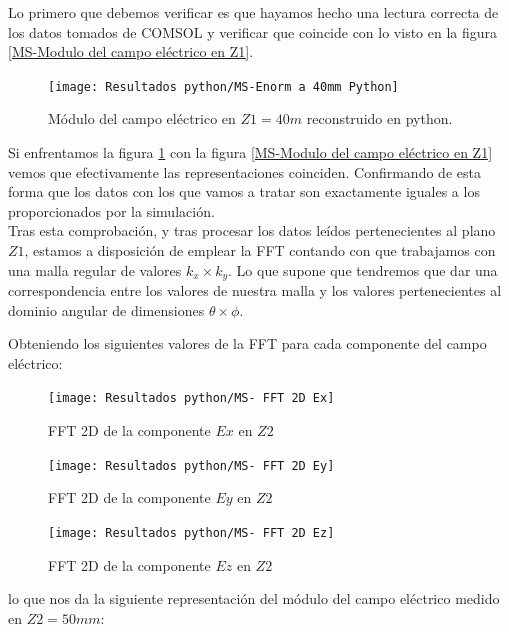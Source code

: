 \documentclass{article}
\begin{document}
\newpage

Lo primero que debemos verificar es que hayamos hecho una lectura correcta de los datos tomados de COMSOL y verificar que coincide con lo visto en la figura \ref{MS-Modulo del campo eléctrico en Z1}.

\begin{figure}[h]
  \centering
    \texttt{[image: Resultados python/MS-Enorm a 40mm Python]}
    \caption{Módulo del campo eléctrico en $Z1 = 40m$ reconstruido en python.}
    \label{MS-MS-Enorm a 40mm Python}
\end{figure}

Si enfrentamos la figura \ref{MS-MS-Enorm a 40mm Python} con la figura \ref{MS-Modulo del campo eléctrico en Z1} vemos que efectivamente las representaciones coinciden. Confirmando de esta forma que los datos con los que vamos a tratar son exactamente iguales a los proporcionados por la simulación.\\

Tras esta comprobación, y tras procesar los datos leídos pertenecientes al plano $Z1$, estamos a disposición de emplear la FFT contando con que trabajamos con una malla regular de valores $k_{x}\times k_{y}$. Lo que supone que tendremos que dar una correspondencia entre los valores de nuestra malla y los valores pertenecientes al dominio angular de dimensiones $\theta \times \phi$.\\

\newpage

Obteniendo los siguientes valores de la FFT para cada componente del campo eléctrico:

\begin{figure}[h]
  \centering
    \texttt{[image: Resultados python/MS- FFT 2D Ex]}
    \caption{FFT 2D de la componente $Ex$ en $Z2$}
    \label{MS- FFT 2D Ex}
\end{figure}

\begin{figure}[h]
  \centering
    \texttt{[image: Resultados python/MS- FFT 2D Ey]}
    \caption{FFT 2D de la componente $Ey$ en $Z2$}
    \label{MS- FFT 2D Ey}
\end{figure}

\newpage

\begin{figure}
  \centering
    \texttt{[image: Resultados python/MS- FFT 2D Ez]}
    \caption{FFT 2D de la componente $Ez$ en $Z2$}
    \label{MS- FFT 2D Ez}
\end{figure}

lo que nos da la siguiente representación del módulo del campo eléctrico medido en $Z2=50mm$:
\end{document}
